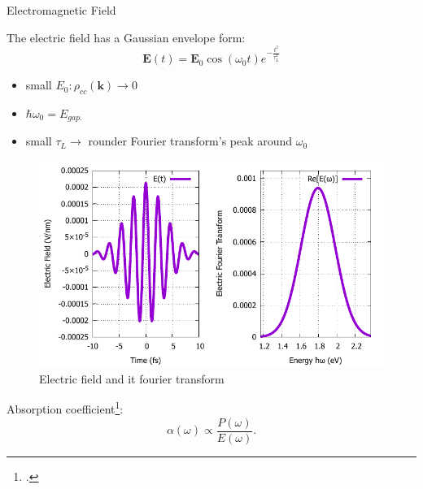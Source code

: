 \documentclass{beamer}
\begin{document}
\begin{frame}{Electromagnetic Field}
	\begin{multicols}{2}
		The electric field has a Gaussian envelope form:
		\begin{equation}
			\textbf{E}(t) = \textbf{E}_0 \cos(\omega_0 t)e^{-\frac{t^2}{\tau_L^2}}
		\end{equation}
		\begin{itemize}
			\item small $E_0: \rho_{cc}(\textbf{k}) \to 0$
			\item $\hbar \omega_0 = E_{gap.}$
			\item small $\tau_L \to $ rounder Fourier transform's peak around $\omega_0$
		\end{itemize}
		\columnbreak
		\begin{figure}[hp]
			\captionsetup{justification=centering}	
			\includegraphics[width=1\linewidth]{images/Eat.pdf}
			\caption{Electric field and it fourier transform}
		\end{figure}
		Absorption coefficient\footcite{haug_quantum_2009}:
		\begin{equation}
			\alpha(\omega) \propto \frac{P(\omega)}{E(\omega)}.
		\end{equation}
	\end{multicols}
\end{frame}
\end{document}
